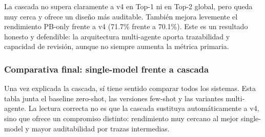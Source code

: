 La cascada no supera claramente a v4 en Top-1 ni en Top-2 global, pero queda muy cerca y ofrece un diseño más auditable. También mejora levemente el rendimiento PB-only frente a v4 (71.7\% frente a 70.1\%). Este es un resultado honesto y defendible: la arquitectura multi-agente aporta trazabilidad y capacidad de revisión, aunque no siempre aumenta la métrica primaria.


\subsubsection*{Comparativa final: single-model frente a cascada}

Una vez explicada la cascada, sí tiene sentido comparar todos los sistemas. Esta tabla junta el baseline zero-shot, las versiones few-shot y las variantes multi-agente. La lectura correcta no es que la cascada sustituya automáticamente a v4, sino que ofrece un compromiso distinto: rendimiento muy cercano al mejor single-model y mayor auditabilidad por trazas intermedias.

